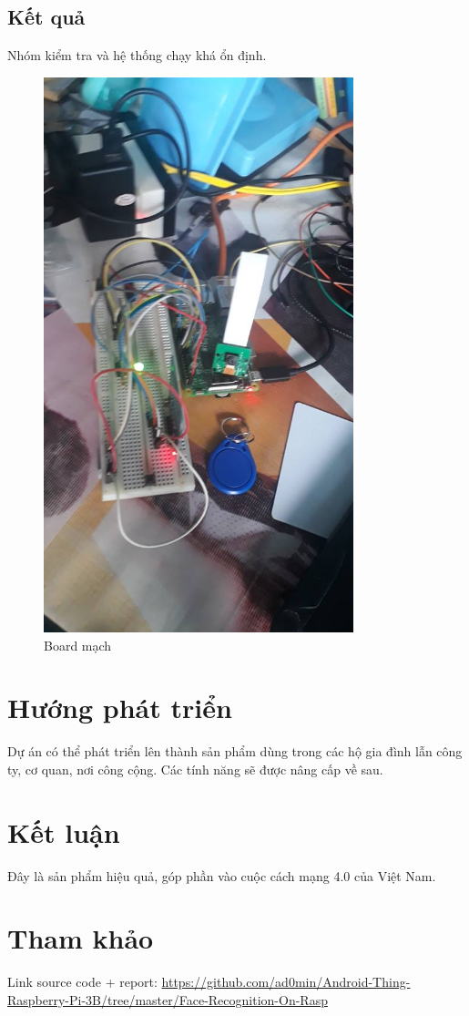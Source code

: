 \documentclass[a4paper]{article}
\begin{document}
\subsection{Kết quả}
\hspace{6mm} Nhóm kiểm tra và hệ thống chạy khá ổn định.
\begin{figure}[h!]
\begin{center}
\includegraphics[width=9cm]{rasp_board.jpg}
\\Board mạch
\end{center}
\end{figure}
\section{Hướng phát triển}
Dự án có thể phát triển lên thành sản phẩm dùng trong các hộ gia đình lẫn công ty, cơ quan, nơi công cộng. Các tính năng sẽ được nâng cấp về sau.

\section{Kết luận}
Đây là sản phẩm hiệu quả, góp phần vào cuộc cách mạng 4.0 của Việt Nam.

\section{Tham khảo}
Link source code + report: \url{https://github.com/ad0min/Android-Thing-Raspberry-Pi-3B/tree/master/Face-Recognition-On-Rasp}


 
\end{document}
